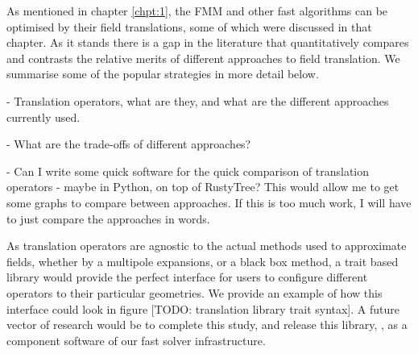 As mentioned in chapter \ref{chpt:1}, the FMM and other fast algorithms can be optimised by their field translations, some of which were discussed in that chapter. As it stands there is a gap in the literature that quantitatively compares and contrasts the relative merits of different approaches to field translation. We summarise some of the popular strategies in more detail below.

- Translation operators, what are they, and what are the different approaches currently used.

- What are the trade-offs of different approaches?

- Can I write some quick software for the quick comparison of translation operators - maybe in Python, on top of RustyTree? This would allow me to get some graphs to compare between approaches. If this is too much work, I will have to just compare the approaches in words.

As translation operators are agnostic to the actual methods used to approximate fields, whether by a multipole expansions, or a black box method, a trait based library would provide the perfect interface for users to configure different operators to their particular geometries. We provide an example of how this interface could look in figure [TODO: translation library trait syntax]. A future vector of research would be to complete this study, and release this library, , as a component software of our fast solver infrastructure.
